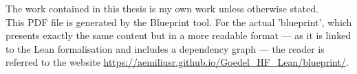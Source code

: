 \newpage
\noindent The work contained in this thesis is my own work unless otherwise stated.\\

\noindent This PDF file is generated by the Blueprint tool.
For the actual 'blueprint', which presents exactly the same content but in a more readable format
— as it is linked to the Lean formalisation and includes a dependency graph —
the reader is referred to the website \url{https://aemiliusr.github.io/Goedel_HF_Lean/blueprint/}.